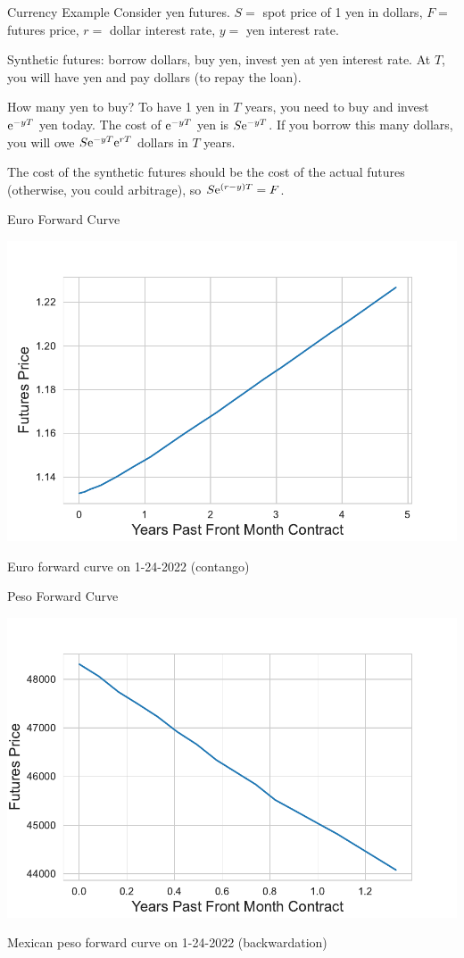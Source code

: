 \documentclass[xcolor=dvipsnames,10pt]{beamer}
\begin{document}
\begin{frame}{Currency Example}
Consider yen futures.  $S=$ spot price of 1 yen in dollars, $F=$ futures price, $r=$ dollar interest rate, $y=$ yen interest rate.

Synthetic futures: borrow dollars, buy yen, invest yen at yen interest rate. At $T$, you will have yen and pay dollars (to repay the loan).

How many yen to buy?  To have 1 yen in $T$ years, you need to buy and invest $\mathrm{e}^{-yT}$ yen today.  The cost of $\mathrm{e}^{-yT}$ yen is $S\mathrm{e}^{-yT}$.  If you borrow this many dollars, you will owe $S\mathrm{e}^{-yT}\mathrm{e}^{rT}$ dollars in $T$ years.  

The cost of the synthetic futures should be the cost of the actual futures (otherwise, you could arbitrage), so $S\mathrm{e}^{(r-y)T} = F$.
\end{frame}

\begin{frame}{Euro Forward Curve}
    \begin{center}
        \includegraphics[scale=0.6]{Images/fig_euro.pdf}
    \end{center}
    Euro forward curve on 1-24-2022 (contango)
\end{frame}

\begin{frame}{Peso Forward Curve}
    \begin{center}
        \includegraphics[scale=0.6]{Images/fig_peso.pdf}
    \end{center}
    Mexican peso forward curve on 1-24-2022 (backwardation)
\end{frame}
\end{document}
